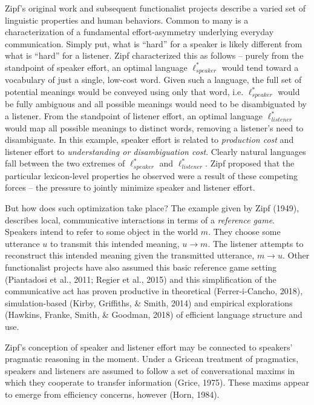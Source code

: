 \documentclass[10pt, letterpaper]{article}
\begin{document}
Zipf's original work and subsequent functionalist projects describe a
varied set of linguistic properties and human behaviors. Common to many
is a characterization of a fundamental effort-asymmetry underlying
everyday communication. Simply put, what is ``hard'' for a speaker is
likely different from what is ``hard'' for a listener. Zipf
characterized this as follows -- purely from the standpoint of speaker
effort, an optimal language \(\ell_{speaker}^*\) would tend toward a
vocabulary of just a single, low-cost word. Given such a language, the
full set of potential meanings would be conveyed using only that word,
i.e. \(\ell_{speaker}^*\) would be fully ambiguous and all possible
meanings would need to be disambiguated by a listener. From the
standpoint of listener effort, an optimal language \(\ell_{listener}^*\)
would map all possible meanings to distinct words, removing a listener's
need to disambiguate. In this example, speaker effort is related to
\emph{production cost} and listener effort to \emph{understanding or
disambiguation cost}. Clearly natural languages fall between the two
extremes of \(\ell_{speaker}^*\) and \(\ell_{listener}^*\). Zipf
proposed that the particular lexicon-level properties he observed were a
result of these competing forces -- the pressure to jointly minimize
speaker and listener effort.\par

But how does such optimization take place? The example given by Zipf
(1949), describes local, communicative interactions in terms of a
\textit{reference game}. Speakers intend to refer to some object in the
world \(m\). They choose some utterance \(u\) to transmit this intended
meaning, \(u \rightarrow m\). The listener attempts to reconstruct this
intended meaning given the transmitted utterance, \(m \rightarrow u\).
Other functionalist projects have also assumed this basic reference game
setting (Piantadosi et al., 2011; Regier et al., 2015) and this
simplification of the communicative act has proven productive in
theoretical (Ferrer-i-Cancho, 2018), simulation-based (Kirby, Griffiths,
\& Smith, 2014) and empirical explorations (Hawkins, Franke, Smith, \&
Goodman, 2018) of efficient language structure and use.\par

Zipf's conception of speaker and listener effort may be connected to
speakers' pragmatic reasoning in the moment. Under a Gricean treatment
of pragmatics, speakers and listeners are assumed to follow a set of
conversational maxims in which they cooperate to transfer information
(Grice, 1975). These maxims appear to emerge from efficiency concerns,
however (Horn, 1984).\par
\end{document}
